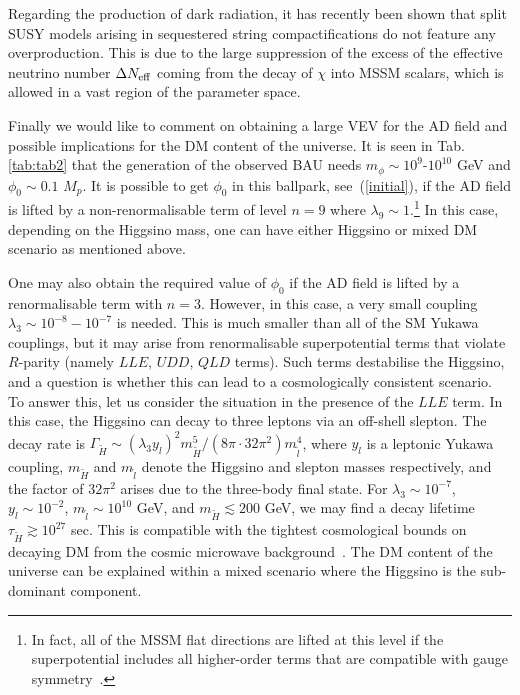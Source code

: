 \documentclass[11pt,a4paper]{article}
\newcommand{\gsim}{\gtrsim}
\newcommand{\lsim}{\lesssim}
\begin{document}
Regarding the production of dark radiation, it has recently been shown \cite{Cicoli:2015bpq} that split SUSY models arising in sequestered string compactifications do not feature any overproduction. This is due to the large suppression of the excess of the effective neutrino number $\Delta N_{\rm eff}$ coming from the decay of $\chi$ into MSSM scalars, which is allowed in a vast region of the parameter space.

Finally we would like to comment on obtaining a large VEV for the AD field and possible implications for the DM content of the universe. It is seen in Tab. \ref{tab:tab2} that the generation of the observed BAU needs $m_\phi \sim 10^9$-$10^{10}$ GeV and $\phi_0 \sim 0.1$ $M_p$. It is possible to get $\phi_0$ in this ballpark, see~(\ref{initial}), if the AD field is lifted by a non-renormalisable term of level $n = 9$ where $\lambda_9 \sim 1$.\footnote{In fact, all of the MSSM flat directions are lifted at this level if the superpotential includes all higher-order terms that are compatible with gauge symmetry~\cite{gkm}.} In this case, depending on the Higgsino mass, one can have either Higgsino or mixed DM scenario as mentioned above. 

One may also obtain the required value of $\phi_0$ if the AD field is lifted by a renormalisable term with $n = 3$. However, in this case, a very small coupling $\lambda_3 \sim 10^{-8}-10^{-7}$ is needed. This is much smaller than all of the SM Yukawa couplings, but it may arise from renormalisable superpotential terms that violate $R$-parity (namely $LLE$, $UDD$, $QLD$ terms). Such terms destabilise the Higgsino, and a question is whether this can lead to a cosmologically consistent scenario. To answer this, let us consider the situation in the presence of the $LLE$ term. In this case, the Higgsino can decay to three leptons via an off-shell slepton. The decay rate is $\Gamma_{\tilde H} \sim (\lambda_3 y_l)^2 m^5_{\tilde H}/(8 \pi \cdot 32 \pi^2) m^4_{\tilde l}$, where $y_l$ is a leptonic Yukawa coupling, $m_{\tilde H}$ and $m_{\tilde l}$ denote the Higgsino and slepton masses respectively, and the factor of $32 \pi^2$ arises due to the three-body final state. For $\lambda_3 \sim 10^{-7}$, $y_l \sim 10^{-2}$, $m_{\tilde l} \sim 10^{10}$ GeV, and $m_{\tilde H} \lsim 200$ GeV, we may find a decay lifetime $\tau_{\tilde H} \gsim 10^{27}$ sec. This is compatible with the tightest cosmological bounds on decaying DM from the cosmic microwave background~\cite{slatyer}. The DM content of the universe can be explained within a mixed scenario where the Higgsino is the sub-dominant component.                
\end{document}
